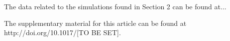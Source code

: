 \documentclass{aptpub}
\begin{document}
\data %
\noindent The data related to the simulations found in Section 2 can be found at...



\supp \noindent The supplementary material for this article can be found at http://doi.org/10.1017/[TO BE SET]. %



%
%
%
%



\end{document}
